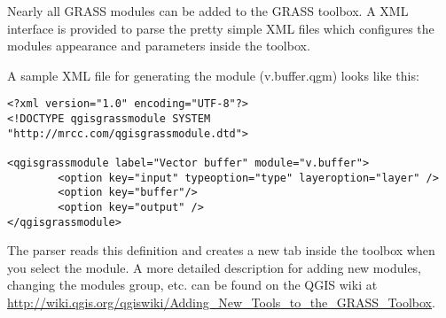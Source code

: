 Nearly all GRASS modules can be added to the GRASS toolbox. A XML
interface is provided to parse the pretty simple XML files which configures
the modules appearance and parameters inside the toolbox.

A sample XML file for generating the module  (v.buffer.qgm)
looks like this:
\begin{verbatim}
<?xml version="1.0" encoding="UTF-8"?>
<!DOCTYPE qgisgrassmodule SYSTEM "http://mrcc.com/qgisgrassmodule.dtd">

<qgisgrassmodule label="Vector buffer" module="v.buffer">
        <option key="input" typeoption="type" layeroption="layer" />
        <option key="buffer"/>
        <option key="output" />
</qgisgrassmodule>
\end{verbatim}

The parser reads this definition and creates a new tab inside the toolbox
when you select the module. A more detailed description for adding new
modules, changing the modules group, etc. can be found on the QGIS wiki at \\
\url{http://wiki.qgis.org/qgiswiki/Adding\_New\_Tools\_to\_the\_GRASS\_Toolbox}.

\FloatBarrier
